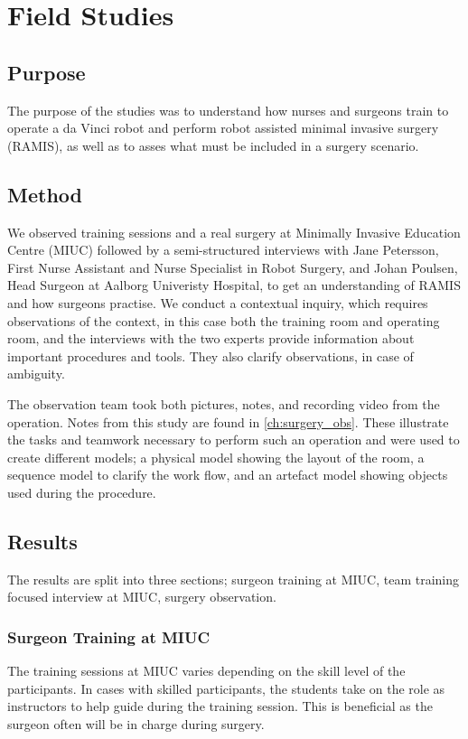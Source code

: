 \chapter{Field Studies}
\section*{Purpose}
The purpose of the studies was to understand how nurses and surgeons train to operate a da Vinci robot and perform robot assisted minimal invasive surgery (RAMIS), as well as to asses what must be included in a surgery scenario.

\section*{Method}
We observed training sessions and a real surgery at Minimally Invasive Education Centre (MIUC) followed by a semi-structured interviews with Jane Petersson, First Nurse Assistant and Nurse Specialist in Robot Surgery, and Johan Poulsen, Head Surgeon at Aalborg Univeristy Hospital, to get an understanding of RAMIS and how surgeons practise. We conduct a contextual inquiry, which requires observations of the context, in this case both the training room and operating room, and the interviews with the two experts provide information about important procedures and tools. They also clarify observations, in case of ambiguity. 

The observation team took both pictures, notes, and recording video from the operation. Notes from this study are found in \autoref{ch:surgery_obs}. These illustrate the tasks and teamwork necessary to perform such an operation and were used to create different models; a physical model showing the layout of the room, a sequence model to clarify the work flow, and an artefact model showing objects used during the procedure.

\section*{Results}
The results are split into three sections; surgeon training at MIUC, team training focused interview at MIUC, surgery observation.

\subsection*{Surgeon Training at MIUC}
The training sessions at MIUC varies depending on the skill level of the participants. In cases with skilled participants, the students take on the role as instructors to help guide during the training session. This is beneficial as the surgeon often will be in charge during surgery.

